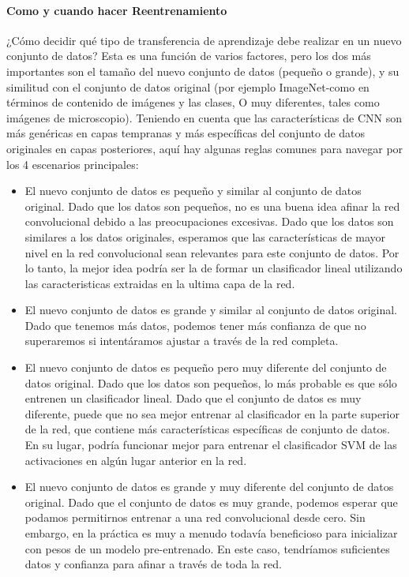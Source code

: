 \documentclass[a4paper,11pt,spanish]{book}
\begin{document}
      \paragraph{Como y cuando hacer Reentrenamiento}
	¿Cómo decidir qué tipo de transferencia de aprendizaje debe realizar en un nuevo conjunto de datos? Esta es una función de varios factores, pero los dos más importantes son el 
	tamaño del nuevo conjunto de datos (pequeño o grande), y su similitud con el conjunto de datos original (por ejemplo ImageNet-como en términos de contenido de imágenes y las clases,
	O muy diferentes, tales como imágenes de microscopio). Teniendo en cuenta que las características de CNN son más genéricas en capas tempranas y más específicas del conjunto de datos
	originales en capas posteriores, aquí hay algunas reglas comunes para navegar por los 4 escenarios principales:
	\begin{itemize}
	  \item El nuevo conjunto de datos es pequeño y similar al conjunto de datos original. Dado que los datos son pequeños, no es una buena idea afinar la red convolucional debido a las 
	  preocupaciones excesivas. Dado que los datos son similares a los datos originales, esperamos que las características de mayor nivel en la red convolucional sean relevantes para este
	  conjunto de datos. Por lo tanto, la mejor idea podría ser la de formar un clasificador lineal utilizando las caracteristicas extraidas en la ultima capa de la red.
	  \item El nuevo conjunto de datos es grande y similar al conjunto de datos original. Dado que tenemos más datos, podemos tener más confianza de que no superaremos si intentáramos 
	  ajustar a través de la red completa.
	  \item El nuevo conjunto de datos es pequeño pero muy diferente del conjunto de datos original. Dado que los datos son pequeños, lo más probable es que sólo entrenen un clasificador 
	  lineal. Dado que el conjunto de datos es muy diferente, puede que no sea mejor entrenar al clasificador en la parte superior de la red, que contiene más características específicas
	  de conjunto de datos. En su lugar, podría funcionar mejor para entrenar el clasificador SVM de las activaciones en algún lugar anterior en la red.
	  \item El nuevo conjunto de datos es grande y muy diferente del conjunto de datos original. Dado que el conjunto de datos es muy grande, podemos esperar que podamos permitirnos 
	  entrenar a una red convolucional desde cero. Sin embargo, en la práctica es muy a menudo todavía beneficioso para inicializar con pesos de un modelo pre-entrenado. 
	  En este caso, tendríamos suficientes datos y confianza para afinar a través de toda la red.
	\end{itemize}
\end{document}
